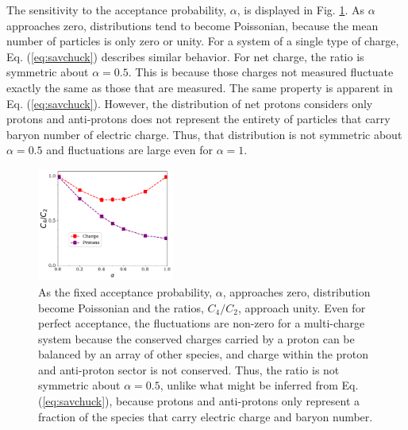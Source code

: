 The sensitivity to the acceptance probability, $\alpha$, is displayed in Fig. \ref{fig:uniform_vs_alpha}. As $\alpha$ approaches zero, distributions tend to become Poissonian, because the mean number of particles is only zero or unity. For a system of a single type of charge, Eq. (\ref{eq:savchuck}) describes similar behavior. For net charge, the ratio is symmetric about $\alpha=0.5$. This is because those charges not measured fluctuate exactly the same as those that are measured. The same property is apparent in Eq. (\ref{eq:savchuck}). However, the distribution of net protons considers only protons and anti-protons does not represent the entirety of particles that carry baryon number of electric charge. Thus, that distribution is not symmetric about $\alpha=0.5$ and fluctuations are large even for $\alpha=1$.
\begin{figure}
\centerline{\includegraphics[width=0.4\textwidth]{figs/m_vs_alpha}}
\caption{\label{fig:uniform_vs_alpha}
As the fixed acceptance probability, $\alpha$, approaches zero, distribution become Poissonian and the ratios, $C_4/C_2$, approach unity. Even for perfect acceptance, the fluctuations are non-zero for a multi-charge system because the conserved charges carried by a proton can be balanced by an array of other species, and charge within the proton and anti-proton sector is not conserved. Thus, the ratio is not symmetric about $\alpha=0.5$, unlike what might be inferred from Eq. (\ref{eq:savchuck}), because protons and anti-protons only represent a fraction of the species that carry electric charge and baryon number.}
\end{figure}

